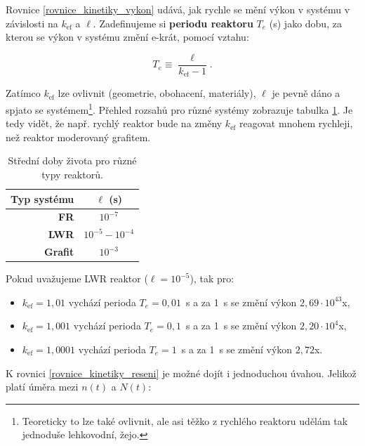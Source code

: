 Rovnice \eqref{rovnice_kinetiky_vykon} udává, jak rychle se mění výkon v systému v závislosti na $k_{\text{ef}}$ a $\ell$. Zadefinujeme si \textbf{periodu reaktoru} $T_e$ (s) jako dobu, za kterou se výkon v systému změní e-krát, pomocí vztahu:

\begin{equation}
  \boxed{
  T_e \equiv \dfrac{\ell}{k_{\text{ef}} - 1}.
  \label{perioda}}
\end{equation}

Zatímco $k_{\text{ef}}$ lze ovlivnit (geometrie, obohacení, materiály), $\ell$ je pevně dáno a spjato se systémem\footnote{Teoreticky to lze také ovlivnit, ale asi těžko z rychlého reaktoru udělám tak jednoduše lehkovodní, žejo.}. Přehled rozsahů pro různé systémy zobrazuje tabulka \ref{table_stredni_doby_zivota}. Je tedy vidět, že např. rychlý reaktor bude na změny $k_{\text{ef}}$ reagovat mnohem rychleji, než reaktor moderovaný grafitem.\\

\begin{table}[H]
\small
\centering
\caption{\small Střední doby života pro různé typy reaktorů.}
\label{table_stredni_doby_zivota}
\begin{tabular}{@{}rc@{}}
\toprule
\textbf{Typ systému} & $\ell$ (s)           \\ \midrule
\textbf{FR}          & $10^{-7}$            \\
\textbf{LWR}         & $10^{-5} - 10^{-4}$  \\
\textbf{Grafit}      & $10^{-3}$            \\ \bottomrule
\end{tabular}
\end{table}

Pokud uvažujeme LWR reaktor ($\ell = 10^{-5}$), tak pro:

\begin{itemize}
  \item $k_{\text{ef}} = 1,01$ vychází perioda $T_e = 0,01$~s a za 1~s se změní výkon $2,69 \cdot 10^{43}$x,
  \item $k_{\text{ef}} = 1,001$ vychází perioda $T_e = 0,1$~s a za 1~s se změní výkon $2,20 \cdot 10^{4}$x,
  \item $k_{\text{ef}} = 1,0001$ vychází perioda $T_e = 1$~s a za 1~s se změní výkon $2,72$x.
\end{itemize}

\normalsize

K rovnici \eqref{rovnice_kinetiky_reseni} je možné dojít i jednoduchou úvahou. Jelikož platí úměra mezi $n(t)$ a $N(t)$:

